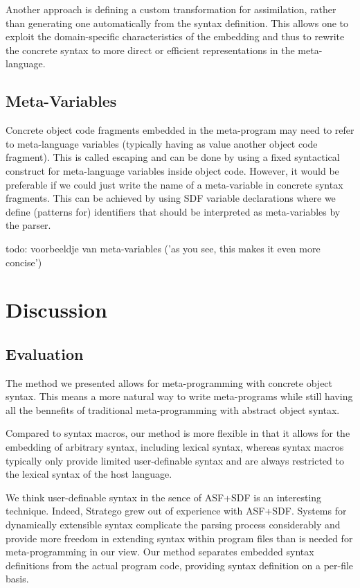\documentclass[a4paper,11pt]{article}
\begin{document}
Another approach is defining a custom transformation for assimilation, rather than
generating one automatically from the syntax definition. This allows one to exploit
the domain-specific characteristics of the embedding and thus to rewrite the
concrete syntax to more direct or efficient representations in the meta-language.


\subsection{Meta-Variables}

Concrete object code fragments embedded in the meta-program may need to refer to
meta-language variables (typically having as value another object code fragment).
This is called escaping and can be done by using a fixed syntactical construct
for meta-language variables inside object code.
However, it would be preferable if we could just write the name of a meta-variable
in concrete syntax fragments. This can be achieved by using SDF variable
declarations where we define (patterns for) identifiers that should be interpreted
as meta-variables by the parser.

todo: voorbeeldje van meta-variables ('as you see, this makes it even more concise')


\section{Discussion}\label{sec:discussion}

\subsection{Evaluation}

The method we presented allows for meta-programming with concrete object syntax.
This means a more natural way to write meta-programs while still having all the
bennefits of traditional meta-programming with abstract object syntax.

Compared to syntax macros, our method is more flexible in that it allows for the
embedding of arbitrary syntax, including lexical syntax, whereas syntax macros
typically only provide limited user-definable syntax and are always restricted
to the lexical syntax of the host language.

We think user-definable syntax in the sence of ASF+SDF is an interesting
technique. Indeed, Stratego grew out of experience with ASF+SDF. Systems for
dynamically extensible syntax complicate the parsing process considerably and
provide more freedom in extending syntax within program files than is needed
for meta-programming in our view. Our method separates embedded syntax
definitions from the actual program code, providing syntax definition on a
per-file basis.
\end{document}
